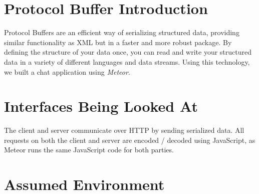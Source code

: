 \documentclass[11pt]{article} %
\begin{document}
%
%
%

\section{Protocol Buffer Introduction}

Protocol Buffers are an efficient way of serializing structured data, providing similar functionality as XML but in a faster and more robust package. By defining the structure of your data once, you can read and write your structured data in a variety of different languages and data streams. Using this technology, we built a chat application using \textit{Meteor}.

\section{Interfaces Being Looked At}


The client and server communicate over HTTP by sending serialized data. All requests on both the client and server are encoded / decoded using JavaScript, as Meteor runs the same JavaScript code for both parties. 

\section{Assumed Environment}

\end{document}
